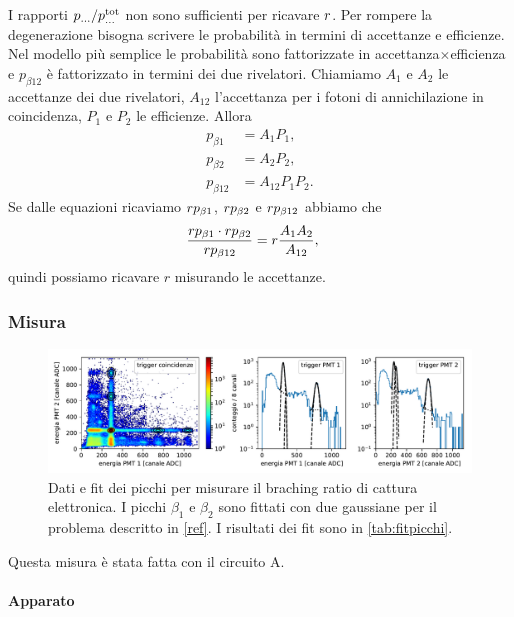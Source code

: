 I rapporti $p_{\dots} / p_{\dots}^\text{tot}$ non sono sufficienti per ricavare $r$.
Per rompere la degenerazione bisogna scrivere le probabilità in termini di accettanze e efficienze.
Nel modello più semplice le probabilità sono fattorizzate in accettanza$\times$efficienza
e $p_{\beta12}$ è fattorizzato in termini dei due rivelatori.
Chiamiamo $A_1$ e $A_2$ le accettanze dei due rivelatori,
$A_{12}$ l'accettanza per i fotoni di annichilazione in coincidenza,
$P_1$ e $P_2$ le efficienze.
Allora
\begin{align*}
	p_{\beta1}
	&= A_1 P_1, \\
	p_{\beta2}
	&= A_2 P_2, \\
	p_{\beta12}
	&= A_{12} P_1 P_2.
\end{align*}
Se dalle equazioni ricaviamo $r p_{\beta1}$, $r p_{\beta2}$ e $r p_{\beta12}$ abbiamo che
\begin{align*}
	\frac {r p_{\beta1} \cdot r p_{\beta2}} {r p_{\beta12}}
	&= r \frac{A_1 A_2}{A_{12}},
\end{align*}
quindi possiamo ricavare $r$ misurando le accettanze.

\subsubsection{Misura}

\begin{figure}
	\hspace{-0.25\textwidth}
	\includegraphics[width=1.5\textwidth]{immagini/ec}
	\caption{\label{fig:ec}
	Dati e fit dei picchi per misurare il braching ratio di cattura elettronica.
	I picchi $\beta_1$ e $\beta_2$ sono fittati con due gaussiane per il problema descritto in \autoref{ref}.
	I risultati dei fit sono in \autoref{tab:fitpicchi}.}
\end{figure}

Questa misura è stata fatta con il circuito A.

\paragraph{Apparato}

